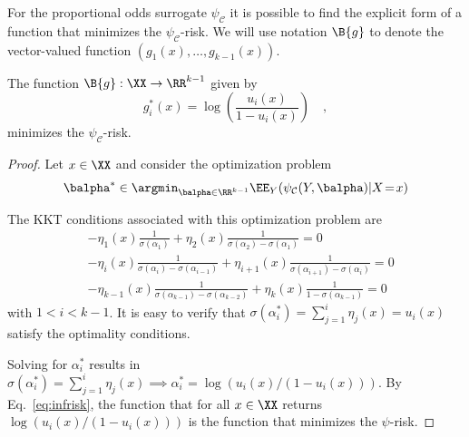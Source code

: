 For the proportional odds surrogate $\psi_{\mathcal{C}}$ it is possible to find the explicit form of a function that minimizes the $\psi_{\mathcal{C}}$-risk. We will use notation $\B{g}$ to denote the vector-valued function $(g_1(x), \ldots, g_{k-1}(x))$.

\begin{theorem}\label{thm:risk_propodds}
The function $\B{g}: \XX \to \RR^{k-1}$ given by
$$
g_i^*(x) = \log\left(\frac{u_i(x)}{1 - u_i(x)}\right) \quad,
$$
minimizes the  $\psi_{\mathcal{C}}$-risk.
\end{theorem}
\begin{proof}
Let $x \in \XX$ and consider the optimization problem
$$
\begin{aligned}
\balpha^* \in \argmin_{\balpha \in \RR^{k-1}}\EE_Y(\psi_{\mathcal{C}}(Y, \balpha)|X\!=\!x) \\
\end{aligned}
$$

The KKT conditions associated with this optimization problem are
$$
\begin{aligned}
&-\eta_1(x)\frac{1}{\sigma(\alpha_1)} + \eta_2(x) \frac{1}{\sigma(\alpha_2) - \sigma(\alpha_1)} = 0\\
&- \eta_i(x) \frac{1}{\sigma(\alpha_i) - \sigma(\alpha_{i-1})} + \eta_{i+1}(x) \frac{1}{\sigma(\alpha_{i+1}) - \sigma(\alpha_i)} = 0 \\
&- \eta_{k-1}(x) \frac{1}{\sigma(\alpha_{k-1}) - \sigma(\alpha_{k-2})} + \eta_{k}(x)\frac{1}{1 - \sigma(\alpha_{k-1})} = 0
\end{aligned}
$$
with $1<i<k-1$.
It is easy to verify that $\sigma(\alpha_i^*) = \sum_{j=1}^i\eta_j(x) = u_i(x)$ satisfy the optimality conditions. 

Solving for $\alpha_i^*$ results in
$\sigma(\alpha_i^*) = \sum_{j=1}^i\eta_j(x) \implies \alpha^*_i = \log\left({u_i(x)}/(1 - u_i(x))\right)$. By Eq.~\eqref{eq:infrisk}, the function that for all $x\in\XX$ returns $\log\left({u_i(x)}/(1 - u_i(x))\right)$ is the function that minimizes the $\psi$-risk.
\end{proof}



